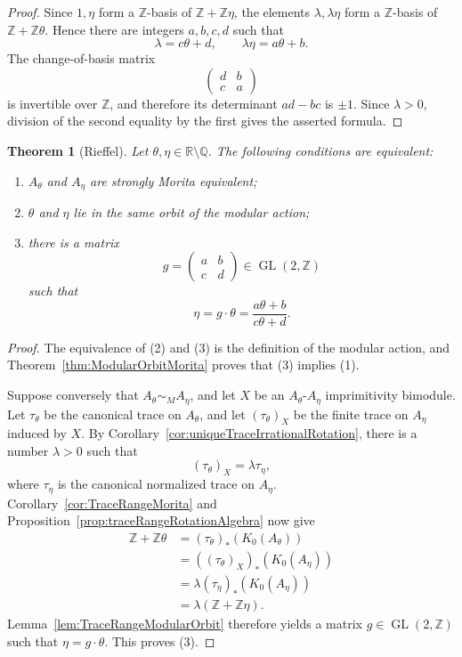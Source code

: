 \documentclass{book}
\newtheorem{theorem}[definition]{Theorem}
\begin{document}
\begin{proof}
  Since \(1,\eta\) form a \(\mathbb Z\)-basis of
  \(\mathbb Z+\mathbb Z\eta\), the elements \(\lambda,\lambda\eta\) form a
  \(\mathbb Z\)-basis of \(\mathbb Z+\mathbb Z\theta\). Hence there are
  integers \(a,b,c,d\) such that
  \[
    \lambda=c\theta+d,
    \qquad
    \lambda\eta=a\theta+b.
  \]
  The change-of-basis matrix
  \[
    \begin{pmatrix}d&b\\c&a\end{pmatrix}
  \]
  is invertible over \(\mathbb Z\), and therefore its determinant
  \(ad-bc\) is \(\pm1\). Since \(\lambda>0\), division of the second
  equality by the first gives the asserted formula.
\end{proof} 

\begin{theorem}[Rieffel]\label{thm:MoritaClassificationIrrationalTori}
  Let \(\theta,\eta\in\mathbb R\setminus\mathbb Q\). The following conditions
  are equivalent:
  \begin{enumerate}
    \item \(A_\theta\) and \(A_\eta\) are strongly Morita equivalent;
    \item \(\theta\) and \(\eta\) lie in the same orbit of the modular action;
    \item there is a matrix
      \[
        g=\begin{pmatrix}a&b\\c&d\end{pmatrix}
        \in\operatorname{GL}(2,\mathbb Z)
      \]
      such that
      \[
        \eta=g\cdot\theta
        =\frac{a\theta+b}{c\theta+d}.
      \]
  \end{enumerate}
\end{theorem}

\begin{proof}
  The equivalence of (2) and (3) is the definition of the modular action, and
  Theorem~\ref{thm:ModularOrbitMorita} proves that (3) implies (1).

  Suppose conversely that \(A_\theta\sim_M A_\eta\), and let \(X\) be an
  \(A_\theta\)-\(A_\eta\) imprimitivity bimodule. Let \(\tau_\theta\) be the
  canonical trace on \(A_\theta\), and let \((\tau_\theta)_X\) be the finite
  trace on \(A_\eta\) induced by \(X\). By
  Corollary~\ref{cor:uniqueTraceIrrationalRotation}, there is a number
  \(\lambda>0\) such that
  \[
    (\tau_\theta)_X=\lambda\tau_\eta,
  \]
  where \(\tau_\eta\) is the canonical normalized trace on \(A_\eta\).
  Corollary~\ref{cor:TraceRangeMorita} and
  Proposition~\ref{prop:traceRangeRotationAlgebra} now give
  \begin{align*}
    \mathbb Z+\mathbb Z\theta
      &=(\tau_\theta)_*(K_0(A_\theta))\\
      &=((\tau_\theta)_X)_*(K_0(A_\eta))\\
      &=\lambda(\tau_\eta)_*(K_0(A_\eta))\\
      &=\lambda(\mathbb Z+\mathbb Z\eta).
  \end{align*}
  Lemma~\ref{lem:TraceRangeModularOrbit} therefore yields a matrix
  \(g\in\operatorname{GL}(2,\mathbb Z)\) such that
  \(\eta=g\cdot\theta\). This proves (3).
\end{proof}
\end{document}
